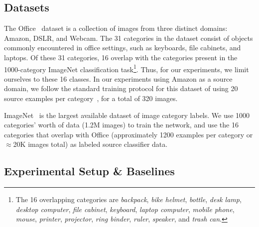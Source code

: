 \label{sec:eval}



\subsection{Datasets}
The Office~\cite{saenko-eccv10} dataset is a collection of images from three
distinct domains: Amazon, DSLR, and Webcam. The 31 categories in the dataset
consist of objects commonly encountered in office settings, such as keyboards,
file cabinets, and laptops. Of these 31 categories, 16 overlap with the
categories present in the 1000-category ImageNet classification task\footnote{
The 16 overlapping categories are
\textit{backpack},
 \textit{bike helmet},
 \textit{bottle},
 \textit{desk lamp},
 \textit{desktop computer},
 \textit{file cabinet},
 \textit{keyboard},
 \textit{laptop computer},
 \textit{mobile phone},
 \textit{mouse},
 \textit{printer},
 \textit{projector},
 \textit{ring binder},
 \textit{ruler},
 \textit{speaker},
 and
 \textit{trash can}.
}.
Thus, for our experiments, we limit ourselves to these
16 classes.  In our experiments using Amazon as a source domain,
we follow the standard training protocol for this dataset of using 20 source
examples per category~\cite{saenko-eccv10,gong-cvpr12}, for a total of 320
images.

ImageNet~\cite{ilsvrc2012} is the largest available dataset of image category labels. We use 1000 categories' worth of data (1.2M images) to train the network, and use the 16 categories that overlap with Office (approximately 1200 examples per category or  $\approx$20K images total) as labeled source classifier data.

\subsection{Experimental Setup \& Baselines}


